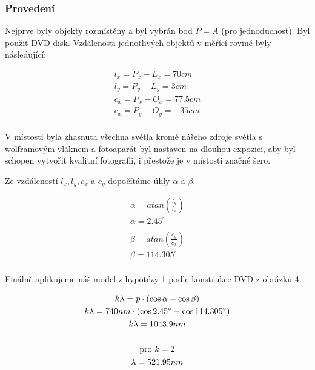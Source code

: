 \documentclass[titlepage]{article}
\begin{document}
\subsubsection{Provedení}

Nejprve byly objekty rozmístěny a byl vybrán bod $P = A$ (pro jednoduchost).
Byl použit DVD disk.
Vzdálenosti jednotlivých objektů v  měřící rovině byly následující:

\begin{equation}\label{eq7}
    \begin{gathered}
        l_x = P_x - L_x = 70cm \\
        l_y = P_y - L_y = 3cm \\
        c_x = P_x - O_x = 77.5cm \\
        c_x = P_y - O_y = -35cm \\
    \end{gathered}
\end{equation}

V místosti byla zhasnuta všechna světla kromě nášeho zdroje světla s wolframovým vláknem a fotoaparát byl nastaven na dlouhou expozici, aby byl schopen vytvořit kvalitní fotografii, i přestože je v místosti značné šero.

Ze vzdáleností $l_x, l_y, c_x$ a $c_y$ dopočítáme úhly $\alpha$ a $\beta$.

\begin{equation}\label{eq8}
    \begin{gathered}
        \alpha = atan \left(\frac{l_y}{l_x}\right) \\
        \alpha = 2.45^{\circ} \\ \\
        \beta = atan \left(\frac{c_y}{c_x}\right) \\
        \beta = 114.305^{\circ} \\
    \end{gathered}
\end{equation}

Finálně aplikujeme náš model z \hyperref[hyp:1]{hypotézy 1} podle konstrukce DVD z \hyperref[image:4]{obrázku 4}.

\begin{equation}\label{eq9}
    \begin{gathered}
        k\lambda = p \cdot (\cos{\alpha} - \cos{\beta}) \\
        k\lambda = 740 nm \cdot (\cos{2.45^{\circ}} - \cos{114.305^{\circ}}) \\
        k\lambda = 1043.9 nm \\ \\
        \textnormal{pro } k = 2 \\
        \lambda = 521.95 nm
    \end{gathered}
\end{equation}
\end{document}
